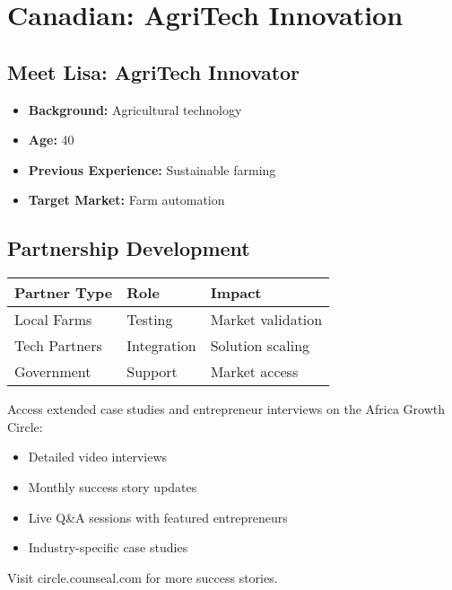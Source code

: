 \section{Canadian: AgriTech Innovation}

\subsection{Meet Lisa: AgriTech Innovator}
\begin{tcolorbox}[colback=white,colframe=primarydark,title=\textbf{Entrepreneur Profile}]
\begin{itemize}
    \item \textbf{Background:} Agricultural technology
    \item \textbf{Age:} 40
    \item \textbf{Previous Experience:} Sustainable farming
    \item \textbf{Target Market:} Farm automation
\end{itemize}
\end{tcolorbox}

\subsection{Partnership Development}
\begin{center}
\begin{tabular}{p{}|p{}|p{}}
    \textbf{Partner Type} & \textbf{Role} & \textbf{Impact} \\
    \hline
    Local Farms & Testing & Market validation \\
    Tech Partners & Integration & Solution scaling \\
    Government & Support & Market access \\
\end{tabular}
\end{center}

\begin{communitybox}
Access extended case studies and entrepreneur interviews on the Africa Growth Circle:
\begin{itemize}
    \item Detailed video interviews
    \item Monthly success story updates
    \item Live Q\&A sessions with featured entrepreneurs
    \item Industry-specific case studies
\end{itemize}
Visit circle.counseal.com for more success stories.
\end{communitybox}

